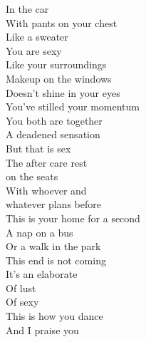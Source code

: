 In the car\\
With pants on your chest\\
Like a sweater\\
You are sexy\\
Like your surroundings\\
Makeup on the windows\\
Doesn't shine in your eyes\\
You've stilled your momentum\\
You both are together\\
A deadened sensation\\
But that is sex\\
The after care rest\\
on the seats\\
With whoever and\\
whatever plans before\\
This is your home for a second\\
A nap on a bus\\
Or a walk in the park\\
This end is not coming\\
It's an elaborate\\
Of lust\\
Of sexy\\
This is how you dance\\
And I praise you\\

